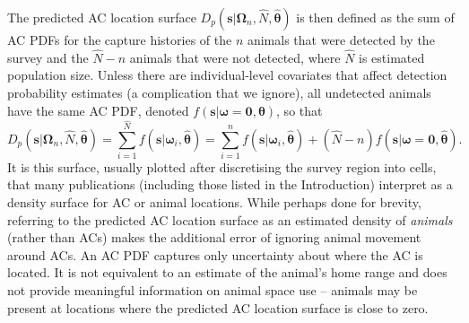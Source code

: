 \documentclass[useAMS,usenatbib,referee]{biom}
\begin{document}
The predicted AC location surface $D_p(\bm{s}|\bm{\Omega}_n,\hat{N},\hat{\bm{\theta}})$ is then defined as the sum of AC PDFs for the capture histories of the $n$ animals that were detected by the survey and the $\hat{N}-n$ animals that were not detected, where $\hat{N}$ is estimated population size. Unless there are individual-level covariates that affect detection probability estimates (a complication that we ignore), all undetected animals have the same AC PDF, denoted $f(\bm{s}|\bm{\omega}=\bm{0}, \bm{\theta})$, so that
\begin{equation} \label{eq:pls}
D_p(\bm{s}|\bm{\Omega}_n,\hat{N},\hat{\bm{\theta}}) =\sum_{i=1}^{\hat{N}} f(\bm{s}|\bm{\omega}_i, \hat{\bm{\theta}})=\sum_{i=1}^n f(\bm{s}|\bm{\omega}_i, \hat{\bm{\theta}})+(\hat{N}-n)f(\bm{s}|\bm{\omega}=\bm{0}, \hat{\bm{\theta}}).
\end{equation}
It is this surface, usually plotted after discretising the survey region into cells, that many publications (including those listed in the Introduction) interpret as a density surface for AC or animal locations. While perhaps done for brevity, referring to the predicted AC location surface as an estimated density of {\it animals} (rather than ACs) makes the additional error of ignoring animal movement around ACs. An AC PDF captures only uncertainty about where the AC is located. It is not equivalent to an estimate of the animal's home range and does not provide meaningful information on animal space use --  animals may be present at locations where the predicted AC location surface is close to zero.





\end{document}
